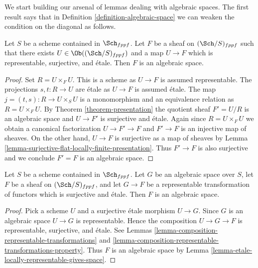 \noindent
We start building our arsenal of lemmas dealing with algebraic spaces.
The first result says that in Definition \ref{definition-algebraic-space}
we can weaken the condition on the diagonal as follows.

\begin{lemma}
\label{lemma-etale-locally-representable-gives-space}
Let $S$ be a scheme contained in $\Sch_{fppf}$.
Let $F$ be a sheaf on $(\Sch/S)_{fppf}$
such that there exists $U \in \Ob((\Sch/S)_{fppf})$ and a map
$U \to F$ which is representable, surjective, and \'etale.
Then $F$ is an algebraic space.
\end{lemma}

\begin{proof}
Set $R = U \times_F U$. This is a scheme as $U \to F$ is assumed representable.
The projections $s, t : R \to U$ are \'etale as $U \to F$ is assumed \'etale.
The map $j = (t, s) : R \to U \times_S U$ is a monomorphism and an equivalence
relation as $R = U \times_F U$. By Theorem \ref{theorem-presentation}
the quotient sheaf $F' = U/R$ is an algebraic space and $U \to F'$
is surjective and \'etale. Again since $R = U \times_F U$ we obtain
a canonical factorization $U \to F' \to F$ and $F' \to F$ is an injective
map of sheaves. On the other hand, $U \to F$ is surjective as a map
of sheaves by Lemma \ref{lemma-surjective-flat-locally-finite-presentation}.
Thus $F' \to F$ is also surjective and we conclude $F' = F$ is an
algebraic space.
\end{proof}

\begin{lemma}
\label{lemma-etale-locally-representable-by-space-gives-space}
Let $S$ be a scheme contained in $\Sch_{fppf}$. Let $G$ be an algebraic
space over $S$, let $F$ be a sheaf on $(\Sch/S)_{fppf}$, and let
$G \to F$ be a representable transformation of functors which is
surjective and \'etale. Then $F$ is an algebraic space.
\end{lemma}

\begin{proof}
Pick a scheme $U$ and a surjective \'etale morphism $U \to G$.
Since $G$ is an algebraic space $U \to G$ is representable.
Hence the composition $U \to G \to F$ is representable,
surjective, and \'etale. See Lemmas
\ref{lemma-composition-representable-transformations} and
\ref{lemma-composition-representable-transformations-property}.
Thus $F$ is an algebraic space by
Lemma \ref{lemma-etale-locally-representable-gives-space}.
\end{proof}

